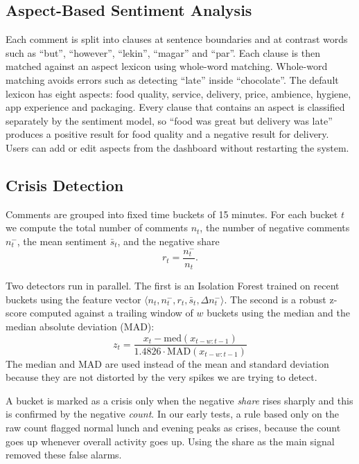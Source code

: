 \documentclass[conference]{IEEEtran}
\begin{document}
\subsection{Aspect-Based Sentiment Analysis}
Each comment is split into clauses at sentence boundaries and at contrast words such as ``but'',
``however'', ``lekin'', ``magar'' and ``par''. Each clause is then matched against an aspect lexicon
using whole-word matching. Whole-word matching avoids errors such as detecting ``late'' inside
``chocolate''. The default lexicon has eight aspects: food quality, service, delivery, price,
ambience, hygiene, app experience and packaging. Every clause that contains an aspect is classified
separately by the sentiment model, so ``food was great but delivery was late'' produces a positive
result for food quality and a negative result for delivery. Users can add or edit aspects from the
dashboard without restarting the system.

\subsection{Crisis Detection}
Comments are grouped into fixed time buckets of 15 minutes. For each bucket $t$ we compute the total
number of comments $n_t$, the number of negative comments $n^-_t$, the mean sentiment $\bar{s}_t$,
and the negative share
\begin{equation}
r_t = \frac{n^-_t}{n_t}.
\end{equation}

Two detectors run in parallel. The first is an Isolation Forest trained on recent buckets using the
feature vector $\langle n_t, n^-_t, r_t, \bar{s}_t, \Delta n^-_t \rangle$. The second is a robust
z-score computed against a trailing window of $w$ buckets using the median and the median absolute
deviation (MAD):
\begin{equation}
z_t = \frac{x_t - \mathrm{med}(x_{t-w:t-1})}{1.4826 \cdot \mathrm{MAD}(x_{t-w:t-1})}
\end{equation}
The median and MAD are used instead of the mean and standard deviation because they are not
distorted by the very spikes we are trying to detect.

A bucket is marked as a crisis only when the negative \textit{share} rises sharply and this is
confirmed by the negative \textit{count}. In our early tests, a rule based only on the raw count
flagged normal lunch and evening peaks as crises, because the count goes up whenever overall
activity goes up. Using the share as the main signal removed these false alarms.
\end{document}

